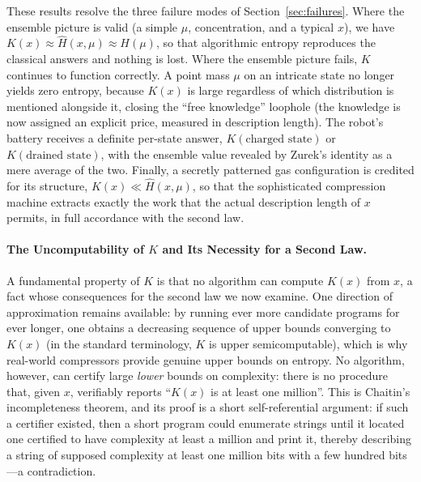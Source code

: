 \documentclass[10pt]{article}
\theoremstyle{definition}
\theoremstyle{remark}
\begin{document}
These results resolve the three failure modes of Section~\ref{sec:failures}. Where the ensemble picture is valid (a simple $\mu$, concentration, and a typical $x$), we have $K(x) \approx \hat H(x,\mu) \approx H(\mu)$, so that algorithmic entropy reproduces the classical answers and nothing is lost. Where the ensemble picture fails, $K$ continues to function correctly. A point mass $\mu$ on an intricate state no longer yields zero entropy, because $K(x)$ is large regardless of which distribution is mentioned alongside it, closing the ``free knowledge'' loophole (the knowledge is now assigned an explicit price, measured in description length). The robot's battery receives a definite per-state answer, $K(\text{charged state})$ or $K(\text{drained state})$, with the ensemble value revealed by Zurek's identity as a mere average of the two. Finally, a secretly patterned gas configuration is credited for its structure, $K(x) \ll \hat H(x,\mu)$, so that the sophisticated compression machine extracts exactly the work that the actual description length of $x$ permits, in full accordance with the second law.

\paragraph{The Uncomputability of $K$ and Its Necessity for a Second Law.} A fundamental property of $K$ is that no algorithm can compute $K(x)$ from $x$, a fact whose consequences for the second law we now examine. One direction of approximation remains available: by running ever more candidate programs for ever longer, one obtains a decreasing sequence of upper bounds converging to $K(x)$ (in the standard terminology, $K$ is upper semicomputable), which is why real-world compressors provide genuine upper bounds on entropy. No algorithm, however, can certify large \emph{lower} bounds on complexity: there is no procedure that, given $x$, verifiably reports ``$K(x)$ is at least one million''. This is Chaitin's incompleteness theorem, and its proof is a short self-referential argument: if such a certifier existed, then a short program could enumerate strings until it located one certified to have complexity at least a million and print it, thereby describing a string of supposed complexity at least one million bits with a few hundred bits---a contradiction.
\end{document}
